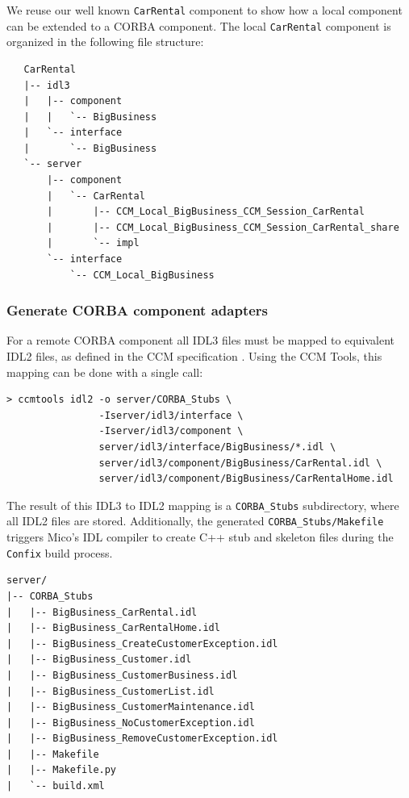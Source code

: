 We reuse our well known {\tt CarRental} component
to show how a local component can be extended to a CORBA component.
The local {\tt CarRental} component is organized in the following file 
structure:

\begin{small}
\begin{verbatim}
   CarRental
   |-- idl3
   |   |-- component
   |   |   `-- BigBusiness
   |   `-- interface
   |       `-- BigBusiness
   `-- server
       |-- component
       |   `-- CarRental
       |       |-- CCM_Local_BigBusiness_CCM_Session_CarRental
       |       |-- CCM_Local_BigBusiness_CCM_Session_CarRental_share
       |       `-- impl
       `-- interface
           `-- CCM_Local_BigBusiness
\end{verbatim}
\end{small}


\subsubsection{Generate CORBA component adapters}

For a remote CORBA component all IDL3 files must be mapped to equivalent
IDL2 files, as defined in the CCM specification \cite{CCMSpecification}.
Using the CCM Tools, this mapping can be done with a single call: 
\begin{small}
\begin{verbatim}
> ccmtools idl2 -o server/CORBA_Stubs \ 
                -Iserver/idl3/interface \ 
                -Iserver/idl3/component \
                server/idl3/interface/BigBusiness/*.idl \
                server/idl3/component/BigBusiness/CarRental.idl \
                server/idl3/component/BigBusiness/CarRentalHome.idl
\end{verbatim}
\end{small}

The result of this IDL3 to IDL2 mapping is a {\tt CORBA\_Stubs} subdirectory,
where all IDL2 files are stored. Additionally, the generated 
{\tt CORBA\_Stubs/Makefile}
triggers Mico's IDL compiler to create C++ stub and skeleton files during
the {\tt Confix} build process.

\begin{small}
\begin{verbatim}
server/
|-- CORBA_Stubs
|   |-- BigBusiness_CarRental.idl
|   |-- BigBusiness_CarRentalHome.idl
|   |-- BigBusiness_CreateCustomerException.idl
|   |-- BigBusiness_Customer.idl
|   |-- BigBusiness_CustomerBusiness.idl
|   |-- BigBusiness_CustomerList.idl
|   |-- BigBusiness_CustomerMaintenance.idl
|   |-- BigBusiness_NoCustomerException.idl
|   |-- BigBusiness_RemoveCustomerException.idl
|   |-- Makefile
|   |-- Makefile.py
|   `-- build.xml
\end{verbatim}
\end{small}

